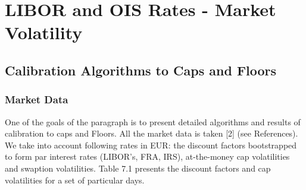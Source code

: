 \documentclass[11pt]{article}
\numberwithin{equation}{subsection}
\begin{document}
\section*{LIBOR and OIS Rates - Market Volatility}

\subsection{Calibration Algorithms to Caps and Floors}
\subsubsection{Market Data}
One of the goals of the paragraph is to present detailed algorithms and results of calibration to caps and Floors.
All the market data is taken [2] (see References). We take into account following rates in EUR: the discount factors
bootstrapped to form par interest rates (LIBOR’s, FRA, IRS), at-the-money cap volatilities and swaption volatilities. Table 7.1 presents the discount factors and cap volatilities for a
set of particular days.
\vskip 0.4cm 		
\end{document}
